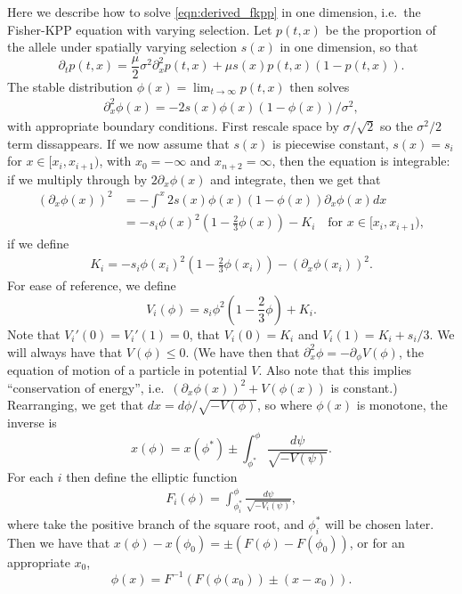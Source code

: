 \documentclass{article}
\begin{document}
Here we describe how to solve \eqref{eqn:derived_fkpp} in one dimension,
i.e.\ the Fisher-KPP equation with varying selection.
Let $p(t,x)$ be the proportion of the allele under spatially varying selection $s(x)$ in one dimension,
so that 
\[
\partial_t p(t,x) = \frac{\mu}{2} \sigma^2 \partial_x^2 p(t,x) + \mu s(x) p(t,x) (1-p(t,x)) .
\]
The stable distribution $\phi(x) = \lim_{t\to\infty} p(t,x)$ then solves
\begin{align} \label{eqn:definingphi}
    \partial_x^2 \phi(x) = - 2 s(x) \phi(x) (1-\phi(x)) /\sigma^2,
\end{align}
with appropriate boundary conditions.
First rescale space by $\sigma/\sqrt{2}$ so the $\sigma^2/2$ term dissappears.
If we now assume that $s(x)$ is piecewise constant,
$s(x) = s_i$ for $x \in [x_i,x_{i+1})$, with $x_0=-\infty$ and $x_{n+2}=\infty$,
then the equation is integrable: if we multiply through by $2\partial_x \phi(x)$ and integrate, then we get that
\begin{align} \label{eqn:conservation}
    ( \partial_x \phi(x) )^2  &= - \int^{x} 2 s(x) \phi(x) (1-\phi(x)) \partial_x \phi(x) dx \\
        &= - s_i \phi(x)^2 \left( 1 - \frac{2}{3} \phi(x) \right) - K_i \quad \mbox{for } x \in [x_i,x_{i+1}) ,
\end{align}
if we define
\begin{align} 
  K_i = - s_i \phi(x_i)^2 \left( 1 - \frac{2}{3} \phi(x_i) \right) - ( \partial_x \phi(x_i) )^2  .
\end{align}
For ease of reference, we define
\[
        V_i(\phi) = s_i \phi^2 \left( 1 - \frac{2}{3} \phi \right) + K_i .
\]
Note that $V_i'(0)=V_i'(1)=0$, that $V_i(0)=K_i$ and $V_i(1) = K_i+s_i/3$.  
We will always have that $V(\phi) \le 0$.
(We have then that $\partial_x^2 \phi = - \partial_\phi V(\phi)$, the equation of motion of a particle in potential $V$.
Also note that this implies ``conservation of energy'', i.e.\ $( \partial_x \phi(x) )^2 + V(\phi(x))$ is constant.)
Rearranging, we get that $dx = d\phi / \sqrt{-V(\phi)}$, so where $\phi(x)$ is monotone, the inverse is
\[
    x(\phi) = x(\phi^*) \pm \int_{\phi^*}^\phi \frac{ d\psi }{ \sqrt{ -V(\psi) } } .
\]
For each $i$ then define the elliptic function
\begin{align}  \label{eqn:elliptic_function}
    F_i(\phi) = \int_{\phi_i^*}^\phi \frac{ d\psi }{ \sqrt{ -V_i(\psi) } } ,
\end{align}
where take the positive branch of the square root, and $\phi_i^*$ will be chosen later.
Then we have that
$x(\phi) - x(\phi_0) = \pm( F(\phi) - F(\phi_0))$,
or for an appropriate $x_0$,
\[
    \phi(x) = F^{-1}\left( F(\phi(x_0)) \pm (x - x_0) \right).
\]
\end{document}
